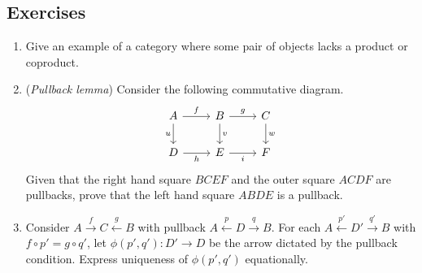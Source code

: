 \documentclass[]{amsbook}
\newcommand{\0}{\mathbf{0}}
\newcommand{\1}{\mathbf{1}}
\begin{document}
\subsection*{Exercises}
\leavevmode
\begin{enumerate}
    \item Give an example of a category where some pair of objects lacks a
    product or coproduct.

    \item (\emph{Pullback lemma}) Consider the following commutative diagram.
    \[
    \begin{tikzcd}
        A \arrow[r, "f"]
          \arrow[d, swap, "u"]
          & B \arrow[r, "g"]
              \arrow[d, "v"]
          & C \arrow[d, "w"] \\
        D \arrow[r, swap, "h"]
          & E \arrow[r, swap, "i"]
          & F
    \end{tikzcd}
    \]
    Given that the right hand square $BCEF$ and the outer square $ACDF$ are
    pullbacks, prove that the left hand square $ABDE$ is a pullback.

    \item Consider $A \xrightarrow{f} C \xleftarrow{g} B$ with pullback
    $A \xleftarrow{p} D \xrightarrow{q} B$. For each $A \xleftarrow{p'} D'
    \xrightarrow{q'} B$ with $f \circ p' = g \circ q'$, let $\phi(p', q'): D'
    \to D$ be the arrow dictated by the pullback condition. Express uniqueness
    of $\phi(p', q')$ equationally.
\end{enumerate}
\end{document}
